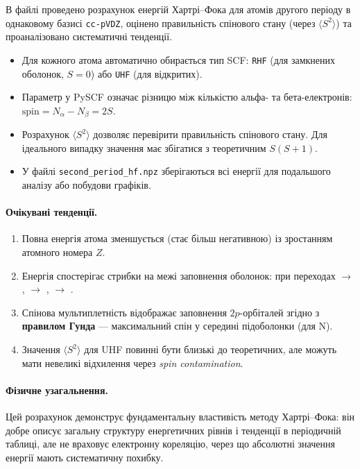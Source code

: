 В файлі  проведено розрахунок енергій Хартрі–Фока для атомів другого періоду в однаковому базисі \texttt{cc-pVDZ}, оцінено правильність спінового стану (через \(\langle S^2 \rangle\)) та проаналізовано систематичні тенденції.

\begin{commentbox}
\begin{itemize}
  \item Для кожного атома автоматично обирається тип SCF: \texttt{RHF} (для замкнених оболонок, $S=0$) або \texttt{UHF} (для відкритих).
  \item Параметр  у PySCF означає різницю між кількістю альфа- та бета-електронів:
        \(\text{spin} = N_\alpha - N_\beta = 2S.\)
  \item Розрахунок \(\langle S^2 \rangle\) дозволяє перевірити правильність спінового стану. Для ідеального випадку значення має збігатися з теоретичним \(S(S+1)\).
  \item У файлі \texttt{second\_period\_hf.npz} зберігаються всі енергії для подальшого аналізу або побудови графіків.
\end{itemize}

\end{commentbox}
\paragraph{Очікувані тенденції.}
\begin{enumerate}
  \item Повна енергія атома зменшується (стає більш негативною) із зростанням атомного номера $Z$.
  \item Енергія спостерігає стрибки на межі заповнення оболонок: при переходах  $\rightarrow$ ,  $\rightarrow$ ,  $\rightarrow$ .
  \item Спінова мультиплетність відображає заповнення $2p$-орбіталей згідно з \textbf{правилом Гунда} --- максимальний спін у середині підоболонки (для N).
  \item Значення \(\langle S^2 \rangle\) для UHF повинні бути близькі до теоретичних, але можуть мати невеликі відхилення через \textit{spin contamination}.
\end{enumerate}

\paragraph{Фізичне узагальнення.}
Цей розрахунок демонструє фундаментальну властивість методу Хартрі–Фока:
він добре описує загальну структуру енергетичних рівнів і тенденції в періодичній таблиці, але не враховує електронну кореляцію, через що абсолютні значення енергії мають систематичну похибку.

